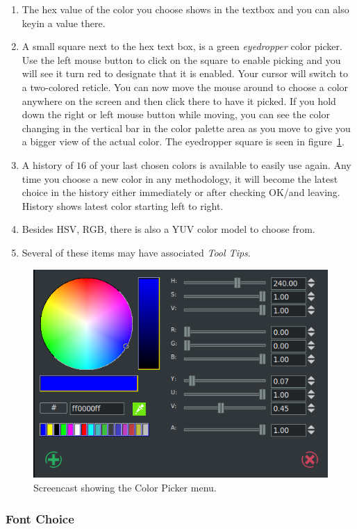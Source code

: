 {\begin{enumerate}
    \item The hex value of the color you choose shows in the textbox and you can also keyin a value there.
    \item A small square next to the hex text box, is a green \textit{eyedropper} color picker. Use the left mouse button to click on the square to enable picking and you will see it turn red to designate that it is enabled. Your cursor will switch to a two-colored reticle. You can now move the mouse around to choose a color anywhere on the screen and then click there to have it picked. If you hold down the right or left mouse button while moving, you can see the color changing in the vertical bar in the color palette area as you move to give you a bigger view of the actual color. The eyedropper square is seen in figure~\ref{fig:title04}.
    \item A history of $16$ of your last chosen colors is available to easily use again. Any time you choose a new color in any methodology, it will become the latest choice in the history either immediately or after checking OK/and leaving. History shows latest color starting left to right.
    \item Besides HSV, RGB, there is also a YUV color model to choose from.
    \item Several of these items may have associated \textit{Tool Tips}.
\end{enumerate}

\begin{figure}[hbtp]
    \centering
    \includegraphics[width=0.6\linewidth]{images/title04.png}
    \caption{Screencast showing the Color Picker menu.}
    \label{fig:title04}
\end{figure}

\subsubsection*{Font Choice}%
\label{ssub:font_choice}

}
